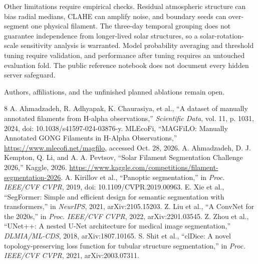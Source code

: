 \documentclass[conference]{IEEEtran}
\begin{document}
Other limitations require empirical checks. Residual atmospheric structure can bias radial medians, CLAHE can amplify noise, and boundary seeds can over-segment one physical filament. The three-day temporal grouping does not guarantee independence from longer-lived solar structures, so a solar-rotation-scale sensitivity analysis is warranted. Model probability averaging and threshold tuning require validation, and performance after tuning requires an untouched evaluation fold. The public reference notebook does not document every hidden server safeguard.

Authors, affiliations, and the unfinished planned ablations remain open. 

\begin{thebibliography}{8}
 A. Ahmadzadeh, R. Adhyapak, K. Chaurasiya, et al., ``A dataset of manually annotated filaments from H-alpha observations,'' \emph{Scientific Data}, vol. 11, p. 1031, 2024, doi: 10.1038/s41597-024-03876-y.
 MLEcoFi, ``MAGFiLO: Manually Annotated GONG Filaments in H-Alpha Observations,'' \url{https://www.mlecofi.net/magfilo}, accessed Oct. 28, 2026.
 A. Ahmadzadeh, D. J. Kempton, Q. Li, and A. A. Pevtsov, ``Solar Filament Segmentation Challenge 2026,'' Kaggle, 2026. \url{https://www.kaggle.com/competitions/filament-segmentation-2026}.
 A. Kirillov et al., ``Panoptic segmentation,'' in \emph{Proc. IEEE/CVF CVPR}, 2019, doi: 10.1109/CVPR.2019.00963.
 E. Xie et al., ``SegFormer: Simple and efficient design for semantic segmentation with transformers,'' in \emph{NeurIPS}, 2021, arXiv:2105.15203.
 Z. Liu et al., ``A ConvNet for the 2020s,'' in \emph{Proc. IEEE/CVF CVPR}, 2022, arXiv:2201.03545.
 Z. Zhou et al., ``UNet++: A nested U-Net architecture for medical image segmentation,'' \emph{DLMIA/ML-CDS}, 2018, arXiv:1807.10165.
 S. Shit et al., ``clDice: A novel topology-preserving loss function for tubular structure segmentation,'' in \emph{Proc. IEEE/CVF CVPR}, 2021, arXiv:2003.07311.
\end{thebibliography}
\end{document}
